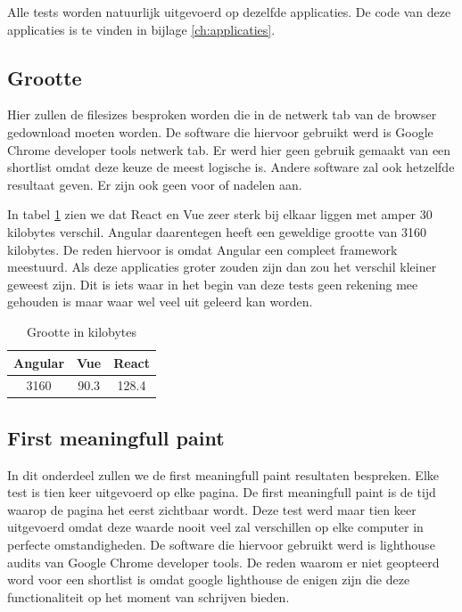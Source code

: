 Alle tests worden natuurlijk uitgevoerd op dezelfde applicaties. De code van deze applicaties is te vinden in bijlage \ref{ch:applicaties}.

\subsection{Grootte}
\label{sec:grootte}

Hier zullen de filesizes besproken worden die in de netwerk tab van de browser gedownload moeten worden. De software die hiervoor gebruikt werd is Google Chrome developer tools netwerk tab. Er werd hier geen gebruik gemaakt van een shortlist omdat deze keuze de meest logische is. Andere software zal ook hetzelfde resultaat geven. Er zijn ook geen voor of nadelen aan.

In tabel \ref{table:file_sizes} zien we dat React en Vue zeer sterk bij elkaar liggen met amper 30 kilobytes verschil. Angular daarentegen heeft een geweldige grootte van 3160 kilobytes. De reden hiervoor is omdat Angular een compleet framework meestuurd. Als deze applicaties groter zouden zijn dan zou het verschil kleiner geweest zijn. Dit is iets waar in het begin van deze tests geen rekening mee gehouden is maar waar wel veel uit geleerd kan worden.

\begin{table}[h]
	\centering
	\caption{Grootte in kilobytes}
	\label{table:file_sizes}
	\begin{tabular}{|c|c|c|} \hline
		Angular &Vue   &React \\ \hline
		3160     &90.3  &128.4 \\ \hline
	\end{tabular}
\end{table}

\subsection{First meaningfull paint}
\label{sec:first_meaningfull_paint}

In dit onderdeel zullen we de first meaningfull paint resultaten bespreken. Elke test is tien keer uitgevoerd op elke pagina. De first meaningfull paint is de tijd waarop de pagina het eerst zichtbaar wordt. Deze test werd maar tien keer uitgevoerd omdat deze waarde nooit veel zal verschillen op elke computer in perfecte omstandigheden. De software die hiervoor gebruikt werd is lighthouse audits van Google Chrome developer tools. De reden waarom er niet geopteerd word voor een shortlist is omdat google lighthouse de enigen zijn die deze functionaliteit op het moment van schrijven bieden.

